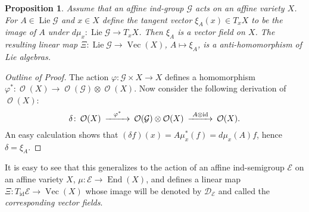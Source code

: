 \documentclass{amsart}
\newtheorem{prop}[thm]{Proposition}
\theoremstyle{definition}
\theoremstyle{remark}
\begin{document}
\begin{prop}\label{vector-fields.prop}
Assume that an affine ind-group ${\mathcal G}$ acts on an affine variety $X$. For  $A \in \operatorname{Lie} {\mathcal G}$ and $x\in X$ define the tangent vector $\xi_{A}(x) \in T_{x}X$ to be the image of $A$ under $d\mu_{x}\colon \operatorname{Lie}{\mathcal G} \to T_{x}X$. Then $\xi_{A}$ is a vector field on $X$. The resulting linear map $\Xi\colon \operatorname{Lie}{\mathcal G} \to \operatorname{Vec}(X)$, $A \mapsto \xi_{A}$, is a anti-homomorphism of Lie algebras.
\end{prop}
\begin{proof}[Outline of Proof]
The action ${\varphi}\colon{\mathcal G}\times X \to X$ defines a homomorphism ${\varphi}^{*}\colon \operatorname{\mathcal O}(X) \to \operatorname{\mathcal O}({\mathcal G})\otimes\operatorname{\mathcal O}(X)$. Now consider the following derivation of $\operatorname{\mathcal O}(X)$:
$$
\begin{CD}
\delta\colon \operatorname{\mathcal O}(X) @>{{\varphi}^{*}}>> \operatorname{\mathcal O}({\mathcal G})\otimes\operatorname{\mathcal O}(X) @>{A\otimes\operatorname{id}}>> \operatorname{\mathcal O}(X).
\end{CD}
$$
An easy calculation shows that $(\delta f)(x) = A \mu_{x}^{*}(f)  = d\mu_{x}(A) f$, hence $\delta = \xi_{A}$.
\end{proof}

It is easy to see that this generalizes to the action of an affine ind-semigroup ${\mathcal E}$ on an affine variety $X$, $\mu\colon{\mathcal E} \to \operatorname{End}(X)$, and defines a linear map $\Xi\colon T_\operatorname{id}{\mathcal E} \to \operatorname{Vec}(X)$ whose image will be denoted by ${\mathcal D}_{\mathcal E}$ and called the {\it corresponding vector fields}. 

\bigskip
\end{document}
